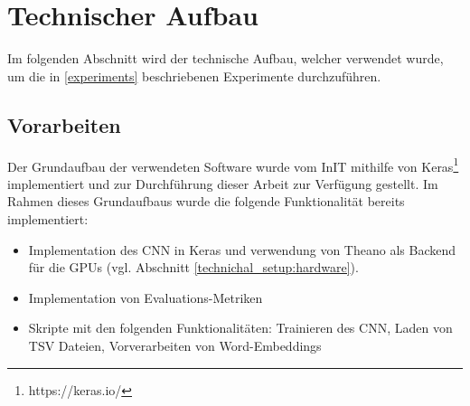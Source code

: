 




\section{Technischer Aufbau}
Im folgenden Abschnitt wird der technische Aufbau, welcher verwendet wurde, um die in \ref{experiments} beschriebenen Experimente durchzuführen.

\subsection{Vorarbeiten}
\label{technichal_setup:prework}
Der Grundaufbau der verwendeten Software wurde vom InIT mithilfe von Keras\footnote{https://keras.io/} implementiert und zur Durchführung dieser Arbeit zur Verfügung gestellt. Im Rahmen dieses Grundaufbaus wurde die folgende Funktionalität bereits implementiert:

\begin{itemize}[noitemsep]
	\item Implementation des CNN in Keras und verwendung von Theano \cite{theanoCitShort} als Backend für die GPUs (vgl. Abschnitt \ref{technichal_setup:hardware}).
	\item Implementation von Evaluations-Metriken
	\item Skripte mit den folgenden Funktionalitäten: Trainieren des CNN, Laden von TSV Dateien, Vorverarbeiten von Word-Embeddings
\end{itemize}

